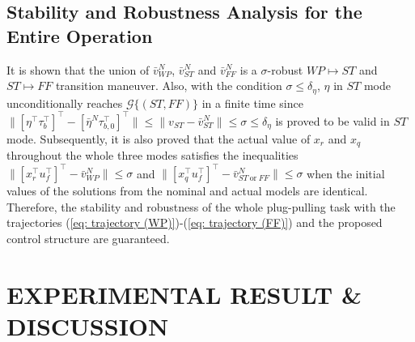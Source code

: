 \documentclass[letterpaper, 10 pt, conference]{ieeeconf}  %
\theoremstyle{definition}
\begin{document}
\subsection{Stability and Robustness Analysis for the Entire Operation} 
It is shown that the union of $\bar{v}^N_{WP}$, $\bar{v}^N_{ST}$ and $\bar{v}^N_{FF}$ is a $\sigma$-robust $WP \mapsto ST$ and $ST \mapsto FF$ transition maneuver. Also, with the condition $\sigma \leq \delta_{\eta}$, $\eta$ in $ST$ mode unconditionally reaches $\mathcal{G}\{(ST, FF)\}$ in a finite time since $\| [\eta^{\top} \tau_b^{\top}]^{\top} - [\bar{\eta}^N \tau_{b, 0}^{\top}]^{\top} \| \leq \| v_{ST} - \bar{v}^N_{ST} \| \leq \sigma \leq \delta_{\eta}$ is proved to be valid in $ST$ mode. Subsequently, it is also proved that the actual value of $x_r$ and $x_q$ throughout the whole three modes satisfies the inequalities $\|[x_r^{\top} u_{f}^{\top}]^{\top} - \bar{v}^N_{WP}\| \leq \sigma$ and $\|[x_q^{\top} u_{f}^{\top}]^{\top} - \bar{v}^N_{ST \ \textrm{or} \ FF}\| \leq \sigma$ when the initial values of the solutions from the nominal and actual models are identical. Therefore, the stability and robustness of the whole plug-pulling task with the trajectories (\ref{eq: trajectory (WP)})-(\ref{eq: trajectory (FF)}) and the proposed control structure are guaranteed.

\section{EXPERIMENTAL RESULT \& DISCUSSION}
\end{document}
